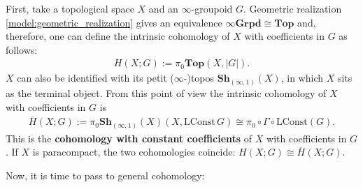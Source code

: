     First, take a topological space $X$ and an $\infty$-groupoid $G$. Geometric realization \ref{model:geometric_realization} gives an equivalence $\infty\mathbf{Grpd}\cong\mathbf{Top}$ and, therefore, one can define the intrinsic cohomology of $X$ with coefficients in $G$ as follows:
    \begin{gather}
        H(X;G) := \pi_0\mathbf{Top}(X,|G|).
    \end{gather}
    $X$ can also be identified with its petit ($\infty$-)topos $\mathbf{Sh}_{(\infty,1)}(X)$, in which $X$ sits as the terminal object. From this point of view the intrinsic cohomology of $X$ with coefficients in $G$ is
    \begin{gather}
        \overline{H}(X;G) := \pi_0\mathbf{Sh}_{(\infty,1)}(X)(X,\mathrm{LConst}\,G)\cong\pi_0\circ\Gamma\circ\mathrm{LConst}(G).
    \end{gather}
    This is the \textbf{cohomology with constant coefficients} of $X$ with coefficients in $G$. If $X$ is paracompact, the two cohomologies coincide: $H(X;G)\cong\overline{H}(X;G)$.

    Now, it is time to pass to general cohomology:

